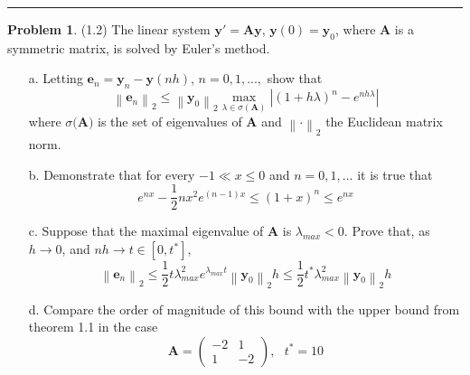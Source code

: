 \documentclass[a4paper, 10pt]{article}
\theoremstyle{definition}
\newtheorem{problem}{Problem}
\theoremstyle{hSol}
\begin{document}
\noindent\rule{16cm}{0.4pt}

\begin{problem} (1.2) The linear system $\bm{y}'=\bm{A} \bm{y}$, $\bm{y}(0)=\bm{y}_0$, where $\bm{A}$ is a symmetric matrix, is solved by Euler's method.
\begin{itemize}
  \item[a.] Letting $\bm{e}_n = \bm{y}_n - \bm{y}(nh)$, $n=0,1,...,$ show that 
  $$
  \left\|\bm{e}_n\right\|_2 \leq \left\|\bm{y}_0\right\|_2 \max\limits_{\lambda \in \sigma(\bm{A})} |(1+h \lambda)^n - e^{nh \lambda}|
  $$
  where $\sigma(\bm{A)}$ is the set of eigenvalues of $\bm{A}$ and $\left\|\cdot\right\|_2$ the Euclidean matrix norm.
  \item[b.] Demonstrate that for every $-1 \ll x \leq 0$ and $n=0,1,...$ it is true that 
  $$
  e^{nx} - \frac{1}{2} nx^2 e^{(n-1)x} \leq (1+x)^n \leq e^{nx}
  $$
  \item[c.] Suppose that the maximal eigenvalue of $\bm{A}$ is $\lambda_{max} < 0$. Prove that, as $h\to 0$, and $nh \to t\in [0,t^*]$,
  $$
  \left\|\bm{e}_n\right\|_2 \leq \frac{1}{2} t \lambda_{max}^2 e^{\lambda_{max} t} \left\|\bm{y}_0\right\|_2 h \leq \frac{1}{2} t^* \lambda_{max}^2 \left\|\bm{y}_0 \right\|_2 h 
  $$
  \item[d.] Compare the order of magnitude of this bound with the upper bound from theorem 1.1 in the case
  $$
  \bm{A} = \begin{pmatrix}
    -2 & 1\\
    1 & -2
  \end{pmatrix},~~~t^*=10
  $$
\end{itemize}
\end{problem}
\end{document}
